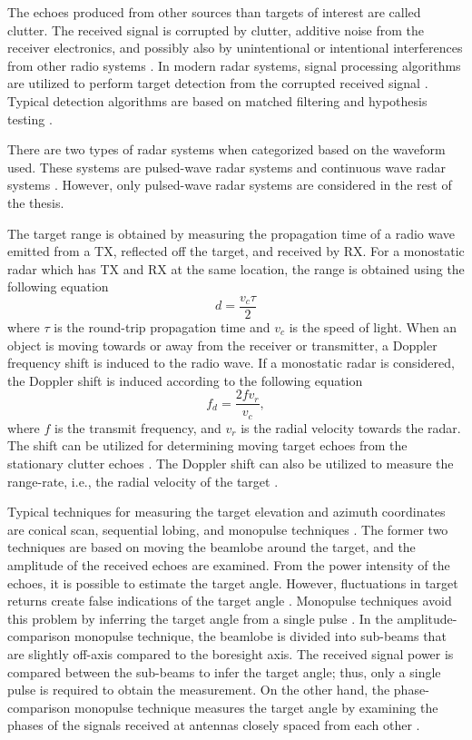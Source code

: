 \documentclass[english, 12pt, a4paper, elec, utf8, a-1b, online]{aaltothesis}
\numberwithin{equation}{section}
\begin{document}
The echoes produced from other sources than targets of interest are called clutter.
The received signal is corrupted by clutter, additive noise from the receiver electronics, and possibly also by unintentional or intentional interferences from other radio systems \cite{Curry2011}.
In modern radar systems, signal processing algorithms are utilized to perform target detection from the corrupted received signal \cite{Mahafza2015}.
Typical detection algorithms are based on matched filtering and hypothesis testing \cite{Mahafza2015}.

There are two types of radar systems when categorized based on the waveform used.
These systems are pulsed-wave radar systems and continuous wave radar systems \cite{Mahafza2015}.
However, only pulsed-wave radar systems are considered in the rest of the thesis.

The target range is obtained by measuring the propagation time of a radio wave emitted from a TX, reflected off the target, and received by RX.
For a monostatic radar which has TX and RX at the same location, the range is obtained using the following equation \cite{Curry2011}
\begin{equation}
\label{eq:target_range}
    d = \frac{ v_c \tau}{2} 
\end{equation}
where $\tau$ is the round-trip propagation time and $v_c$ is the speed of light.
When an object is moving towards or away from the receiver or transmitter, a Doppler frequency shift is induced to the radio wave.
If a monostatic radar is considered, the Doppler shift is induced  according to the following equation \cite{Curry2011}
\begin{equation}
\label{eq:doppler_freq}
    f_d = \frac{2 f v_r}{v_c},
\end{equation}
where $f$ is the transmit frequency, and $v_r$ is the radial velocity towards the radar.
The shift can be utilized for determining moving target echoes from the stationary clutter echoes \cite{Curry2011}.
The Doppler shift can also be utilized to measure the range-rate, i.e., the radial velocity of the target \cite{Curry2011}.

Typical techniques for measuring the target elevation and azimuth coordinates are conical scan, sequential lobing, and monopulse techniques \cite{Sherman2011}. 
The former two techniques are based on moving the beamlobe around the target, and the amplitude of the received echoes are examined. 
From the power intensity of the echoes, it is possible to estimate the target angle.
However, fluctuations in target returns create false indications of the target angle \cite{Sherman2011}.
Monopulse techniques avoid this problem by inferring the target angle from a single pulse \cite{Sherman2011}.
In the amplitude-comparison monopulse technique, the beamlobe is divided into sub-beams that are slightly off-axis compared to the boresight axis.  
The received signal power is compared between the sub-beams to infer the target angle; thus, only a single pulse is required to obtain the measurement.
On the other hand, the phase-comparison monopulse technique measures the target angle by examining the phases of the signals received at antennas closely spaced from each other \cite{Sherman2011}.
\end{document}
